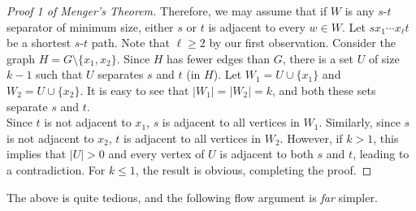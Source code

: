 \begin{proof}[Proof 1 of Menger's Theorem]
				Therefore, we may assume that if $W$ is any $s$-$t$ separator of minimum size, either $s$ or $t$ is adjacent to every $w \in W$. Let $s x_1 \cdots x_\ell t$ be a shortest $s$-$t$ path. Note that $\ell \ge 2$ by our first observation. Consider the graph $H = G \setminus \{x_1,x_2\}$. Since $H$ has fewer edges than $G$, there is a set $U$ of size $k-1$ such that $U$ separates $s$ and $t$ (in $H$). Let $W_1 = U \cup \{x_1\}$ and $W_2 = U \cup \{x_2\}$. It is easy to see that $|W_1| = |W_2| = k$, and both these sets separate $s$ and $t$.\\
				Since $t$ is not adjacent to $x_1$, $s$ is adjacent to all vertices in $W_1$. Similarly, since $s$ is not adjacent to $x_2$, $t$ is adjacent to all vertices in $W_2$. However, if $k>1$, this implies that $|U|>0$ and every vertex of $U$ is adjacent to both $s$ and $t$, leading to a contradiction. For $k \le 1$, the result is obvious, completing the proof.
			\end{proof}

			The above is quite tedious, and the following flow argument is \emph{far} simpler.

				
